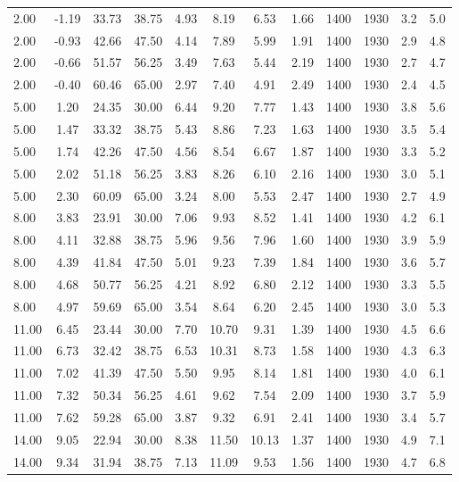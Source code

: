 \documentclass[english]{SPFShortReport}
\begin{document}
\begin{table}[!ht]
\begin{small}
\begin{center}
{\begin{tabular}{l | c c c c c c c c c c c }
2.00 & -1.19 & 33.73 & 38.75 & 4.93 & 8.19 & 6.53 & 1.66 & 1400 & 1930 & 3.2 & 5.0\\ 
2.00 & -0.93 & 42.66 & 47.50 & 4.14 & 7.89 & 5.99 & 1.91 & 1400 & 1930 & 2.9 & 4.8\\ 
2.00 & -0.66 & 51.57 & 56.25 & 3.49 & 7.63 & 5.44 & 2.19 & 1400 & 1930 & 2.7 & 4.7\\ 
2.00 & -0.40 & 60.46 & 65.00 & 2.97 & 7.40 & 4.91 & 2.49 & 1400 & 1930 & 2.4 & 4.5\\ 
5.00 & 1.20 & 24.35 & 30.00 & 6.44 & 9.20 & 7.77 & 1.43 & 1400 & 1930 & 3.8 & 5.6\\ 
5.00 & 1.47 & 33.32 & 38.75 & 5.43 & 8.86 & 7.23 & 1.63 & 1400 & 1930 & 3.5 & 5.4\\ 
5.00 & 1.74 & 42.26 & 47.50 & 4.56 & 8.54 & 6.67 & 1.87 & 1400 & 1930 & 3.3 & 5.2\\ 
5.00 & 2.02 & 51.18 & 56.25 & 3.83 & 8.26 & 6.10 & 2.16 & 1400 & 1930 & 3.0 & 5.1\\ 
5.00 & 2.30 & 60.09 & 65.00 & 3.24 & 8.00 & 5.53 & 2.47 & 1400 & 1930 & 2.7 & 4.9\\ 
8.00 & 3.83 & 23.91 & 30.00 & 7.06 & 9.93 & 8.52 & 1.41 & 1400 & 1930 & 4.2 & 6.1\\ 
8.00 & 4.11 & 32.88 & 38.75 & 5.96 & 9.56 & 7.96 & 1.60 & 1400 & 1930 & 3.9 & 5.9\\ 
8.00 & 4.39 & 41.84 & 47.50 & 5.01 & 9.23 & 7.39 & 1.84 & 1400 & 1930 & 3.6 & 5.7\\ 
8.00 & 4.68 & 50.77 & 56.25 & 4.21 & 8.92 & 6.80 & 2.12 & 1400 & 1930 & 3.3 & 5.5\\ 
8.00 & 4.97 & 59.69 & 65.00 & 3.54 & 8.64 & 6.20 & 2.45 & 1400 & 1930 & 3.0 & 5.3\\ 
11.00 & 6.45 & 23.44 & 30.00 & 7.70 & 10.70 & 9.31 & 1.39 & 1400 & 1930 & 4.5 & 6.6\\ 
11.00 & 6.73 & 32.42 & 38.75 & 6.53 & 10.31 & 8.73 & 1.58 & 1400 & 1930 & 4.3 & 6.3\\ 
11.00 & 7.02 & 41.39 & 47.50 & 5.50 & 9.95 & 8.14 & 1.81 & 1400 & 1930 & 4.0 & 6.1\\ 
11.00 & 7.32 & 50.34 & 56.25 & 4.61 & 9.62 & 7.54 & 2.09 & 1400 & 1930 & 3.7 & 5.9\\ 
11.00 & 7.62 & 59.28 & 65.00 & 3.87 & 9.32 & 6.91 & 2.41 & 1400 & 1930 & 3.4 & 5.7\\ 
14.00 & 9.05 & 22.94 & 30.00 & 8.38 & 11.50 & 10.13 & 1.37 & 1400 & 1930 & 4.9 & 7.1\\ 
14.00 & 9.34 & 31.94 & 38.75 & 7.13 & 11.09 & 9.53 & 1.56 & 1400 & 1930 & 4.7 & 6.8\\ 

\end{tabular}}
\end{center}
\end{small}
\end{table}
\end{document}
